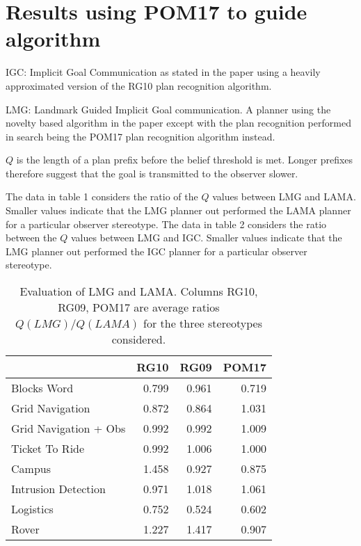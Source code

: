 \documentclass{article}
\begin{document}
\section{Results using POM17 to guide algorithm}
IGC: Implicit Goal Communication as stated in the paper using a heavily approximated version
of the RG10 plan recognition algorithm.

\noindent LMG: Landmark Guided Implicit Goal communication. A planner using the novelty based algorithm
in the paper except with the plan recognition performed in search being the POM17 plan recognition
algorithm instead.

$Q$ is the length of a plan prefix before the belief threshold is met. Longer prefixes therefore
suggest that the goal is transmitted to the observer slower.

The data in table 1 considers the ratio of the $Q$ values between LMG and LAMA. Smaller
values indicate that the LMG planner out performed the LAMA planner for a particular observer stereotype.
The data in table 2
considers the ratio between the $Q$ values between LMG and IGC. Smaller values indicate that the LMG
planner out performed the IGC planner for a particular observer stereotype.

\begin{table}[htbp]
\begin{tabular}{|l|r|r|r|}
\hline
 & \multicolumn{1}{l|}{RG10} & \multicolumn{1}{l|}{RG09} & \multicolumn{1}{l|}{POM17} \\ \hline
Blocks Word & 0.799 & 0.961 & 0.719 \\ \hline
Grid Navigation & 0.872 & 0.864 & 1.031 \\ \hline
Grid Navigation + Obs & 0.992 & 0.992 & 1.009 \\ \hline
Ticket To Ride & 0.992 & 1.006 & 1.000 \\ \hline
Campus & 1.458 & 0.927 & 0.875 \\ \hline
Intrusion Detection & 0.971 & 1.018 & 1.061 \\ \hline
Logistics & 0.752 & 0.524 & 0.602 \\ \hline
Rover & 1.227 & 1.417 & 0.907 \\ \hline
\end{tabular}
\label{LMG:LAMA}
\caption{Evaluation of LMG and LAMA. Columns RG10, RG09,
POM17 are average ratios $Q(LMG)/Q(LAMA)$ for the three
stereotypes considered.}
\end{table}
\end{document}
